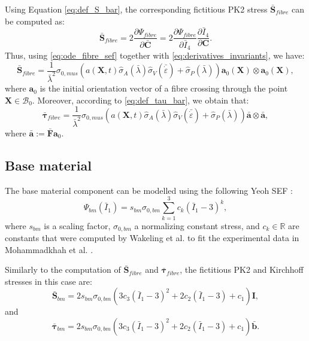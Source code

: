 \documentclass{sfuthesis}
\numberwithin{equation}{section}
\numberwithin{figure}{chapter}
\numberwithin{table}{chapter}
\theoremstyle{definition}
\def\*#1{{\mathbf{#1}}} %
\newcommand{\pder}[2]{\dfrac{\partial #1}{\partial #2}}
\newcommand{\depsilon}{\dot{\varepsilon}}
\newcommand{\R}{\mathbb{R}}
\newcommand{\B}{\mathcal{B}}
\newcommand{\I}{{\bar{I}}}
\def\btau{{\bm{\tau}}}
\begin{document}
Using Equation \eqref{eq:def_S_bar}, the corresponding fictitious PK2 stress $\bar{\*S}_{fibre}$ can be computed as:
\begin{equation}
    \bar{\*S}_{fibre} = 2 \pder{\Psi_{fibre}}{\bar{\*C}} = 2 \pder{\Psi_{fibre}}{\I_4} \pder{\I_4}{\*C}.
\end{equation}
Thus, using \eqref{eq:ode_fibre_sef} together with \eqref{eq:derivatives_invariants}, we have:
\begin{equation} \label{eq:def_S_fibre}
    \bar{\*S}_{fibre} = \dfrac{1}{\bar{\lambda}^2} \sigma_{0,mus} \left( a(\*X,t) \widehat{\sigma}_A(\bar{\lambda}) \widehat{\sigma}_V(\bar{\depsilon}) + \widehat{\sigma}_P(\bar{\lambda}) \right) \*a_0(\*X) \otimes \*a_0(\*X),
\end{equation}
where $\*a_0$ is the initial orientation vector of a fibre crossing through the point $\*X \in \B_0$. Moreover, according to \eqref{eq:def_tau_bar}, we obtain that:
\begin{equation} \label{eq:def_tau_bar_fibre}
    \bar{\btau}_{fibre} = \dfrac{1}{\bar{\lambda}^2} \sigma_{0,mus} \left( a(\*X,t) \widehat{\sigma}_A(\bar{\lambda}) \widehat{\sigma}_V(\bar{\depsilon}) + \widehat{\sigma}_P(\bar{\lambda}) \right) \bar{\*a} \otimes \bar{\*a},
\end{equation}
where $\bar{\*a} := \bar{\*F}\*a_0$.

\subsection{Base material}

The base material component can be modelled using the following Yeoh SEF \cite{Paper3_RossEtAl2021, Paper2_RyanEtAl2020, Paper1_WakelingEtAl2020}:
\begin{equation}\label{eq:def_Psi_bm}
    \Psi_{bm}(\I_1) = s_{bm} \sigma_{0,bm} \sum_{k=1}^3 c_k (\I_1 - 3)^k,
\end{equation}
where $s_{bm}$ is a scaling factor, $\sigma_{0,bm}$ a normalizing constant stress, and $c_k \in \R$ are constants that were computed by Wakeling et al. \cite{Paper1_WakelingEtAl2020} to fit the experimental data in Mohammadkhah et al. \cite{Mohammadkhah2016}.

Similarly to the computation of $\bar{\*S}_{fibre}$ and $\bar{\btau}_{fibre}$, the fictitious PK2 and Kirchhoff stresses in this case are:
\begin{equation} \label{eq:def_S_bar_bm}
    \bar{\*S}_{bm} = 2s_{bm} \sigma_{0,bm} \left( 3c_3(\I_1-3)^2 + 2c_2 (\I_1-3) + c_1 \right) \*I,
\end{equation}
and
\begin{equation}
    \bar{\btau}_{bm} = 2s_{bm} \sigma_{0,bm} \left( 3c_3(\I_1-3)^2 + 2c_2 (\I_1-3) + c_1 \right) \bar{\*b}.
\end{equation}
\end{document}
